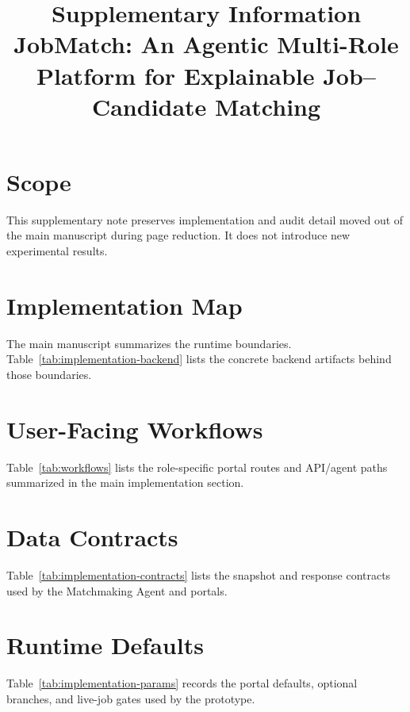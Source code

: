 \documentclass[11pt,a4paper]{article}
\title{Supplementary Information\\JobMatch: An Agentic Multi-Role Platform for Explainable Job--Candidate Matching}
\author{}
\date{}
\newcommand{\suppTable}[1]{%
  \begin{table}[htbp]
  \centering
  
  \end{table}
}
\begin{document}
\maketitle
\thispagestyle{empty}

\section*{Scope}

This supplementary note preserves implementation and audit detail moved out of the main manuscript during page reduction. It does not introduce new experimental results.

\section*{Implementation Map}

The main manuscript summarizes the runtime boundaries. Table~\ref{tab:implementation-backend} lists the concrete backend artifacts behind those boundaries.

\suppTable{tab-implementation-backend.tex}

\section*{User-Facing Workflows}

Table~\ref{tab:workflows} lists the role-specific portal routes and API/agent paths summarized in the main implementation section.

\suppTable{tab-workflows.tex}

\section*{Data Contracts}

Table~\ref{tab:implementation-contracts} lists the snapshot and response contracts used by the Matchmaking Agent and portals.

\suppTable{tab-implementation-contracts.tex}

\section*{Runtime Defaults}

Table~\ref{tab:implementation-params} records the portal defaults, optional branches, and live-job gates used by the prototype.

\suppTable{tab-implementation-params.tex}
\end{document}
